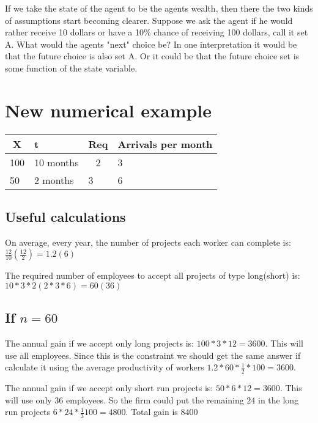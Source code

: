 \documentclass[12pt]{report}
\numberwithin{equation}{section}
\begin{document}
If we take the state of the agent to be the agents wealth, then there the two kinds of assumptions start becoming clearer. Suppose we ask the agent if he would rather receive 10 dollars or have a 10\% chance of receiving 100 dollars, call it set A. What would the agents "next" choice be? In one interpretation it would be that the future choice is also set A. Or it could be that the future choice set is some function of the state variable. 



\section{New numerical example}

\begin{table}[]
\begin{tabular}{|c|l|l|l|}
\hline
X                        & t         & Req                    & Arrivals per month \\ \hline
100                      & 10 months & \multicolumn{1}{c|}{2} & 3                  \\ \hline
\multicolumn{1}{|l|}{50} & 2 months  & 3                      & 6                  \\ \hline
\end{tabular}
\end{table}

\subsection{Useful calculations}
On average, every year, the number of projects each worker can complete is: $\frac{12}{10}(\frac{12}{2})=1.2(6)$

The required number of employees to accept all projects of type long(short) is: $10*3*2(2*3*6)=60(36)$

\subsection{If $n=60$ }

The annual gain if we accept only long projects is: $100*3*12=3600$. This will use all employees. Since this is the constraint we should get the same answer if calculate it using the average productivity of workers $1.2*60*\frac{1}{2}*100=3600$. 

The annual gain if we accept only short run projects is: $50*6*12=3600$. This will use only 36 employees. So the firm could put the remaining $24$ in the long run projects $6*24*\frac{1}{3}100=4800$. Total gain is $8400$
\end{document}
